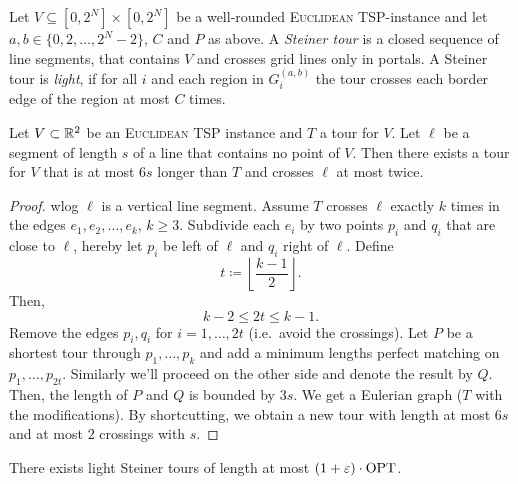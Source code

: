 \documentclass[../skript.tex]{subfiles}
\begin{document}
Let $V \subseteq [0, 2^N] \times [0, 2^N]$ be a well-rounded \textsc{Euclidean TSP}-instance and let $a, b \in \{ 0, 2, \ldots, 2^N - 2 \}$, $C$ and $P$ as above.
A \emph{Steiner tour} is a closed sequence of line segments, that contains $V$ and crosses grid lines only in portals. A Steiner tour is \emph{light}, if for all $i$ and each region in $G_i^{(a, b)}$ the tour crosses each border edge of the region at most $C$ times.
\begin{lemma} %
\label{thm:95}
Let $V \subset \mathbb{R}^2$ be an \textsc{Euclidean TSP} instance and $T$ a tour for $V$. Let $\ell$ be a segment of length $s$ of a line that contains no point of $V$. Then there exists a tour for $V$ that is at most $6s$ longer than $T$ and crosses $\ell$ at most twice.
\end{lemma}
\begin{proof}
\ac{wlog} $\ell$ is a vertical line segment. Assume $T$ crosses $\ell$ exactly $k$ times in the edges $e_1, e_2, \ldots, e_k$, $k \geq 3$.
Subdivide each $e_i$ by two points $p_i$ and $q_i$ that are close to $\ell$, hereby let $p_i$ be left of $\ell$ and $q_i$ right of $\ell$.
Define
\[
	t \coloneqq \left\lfloor \frac{k-1}{2} \right\rfloor.
\]
Then,
\[
	k - 2 \leq 2 t \leq k - 1.
\]
Remove the edges $p_i, q_i$ for $i = 1, \ldots, 2t$ (i.e.\ avoid the crossings). Let $P$ be a shortest tour through $p_1, \ldots, p_k$ and add a minimum lengths perfect matching on $p_1, \ldots, p_{2t}$. Similarly we'll proceed on the other side and denote the result by $Q$.
Then, the length of $P$ and $Q$ is bounded by $3s$.
We get a Eulerian graph ($T$ with the modifications). By shortcutting, we obtain a new tour with length at most $6s$ and at most $2$ crossings with $s$.
\end{proof}
\begin{theorem}
There exists light Steiner tours of length at most $(1 + \varepsilon) \cdot \operatorname{OPT}$.
\end{theorem}
\end{document}
